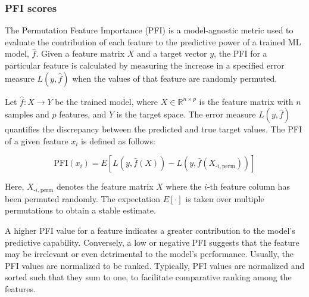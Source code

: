 \subsubsection{PFI scores}

The Permutation Feature Importance (PFI) is a model-agnostic metric used to evaluate the contribution of each feature to the predictive power of a trained \gls{ML} model, \(\hat{f}\). Given a feature matrix \(X\) and a target vector \(y\), the \gls{PFI} for a particular feature is calculated by measuring the increase in a specified error measure \(L(y, \hat{f})\) when the values of that feature are randomly permuted.

Let \(\hat{f}: X \rightarrow Y\) be the trained model, where \(X \in \mathbb{R}^{n \times p}\) is the feature matrix with \(n\) samples and \(p\) features, and \(Y\) is the target space. The error measure \(L(y, \hat{f})\) quantifies the discrepancy between the predicted and true target values. The \gls{PFI} of a given feature \(x_i\) is defined as follows:

\begin{equation}
\text{PFI}(x_i) = E\left[ L(y, \hat{f}(X)) - L\left(y, \hat{f}(X_{\text{-}i, \text{perm}})\right) \right]
\end{equation}

Here, \(X_{\text{-}i, \text{perm}}\) denotes the feature matrix \(X\) where the \(i\)-th feature column has been permuted randomly. The expectation \(E[\cdot]\) is taken over multiple permutations to obtain a stable estimate.

A higher \gls{PFI} value for a feature indicates a greater contribution to the model's predictive capability. Conversely, a low or negative \gls{PFI} suggests that the feature may be irrelevant or even detrimental to the model's performance. Usually, the \gls{PFI} values are normalized to be ranked. Typically, \gls{PFI} values are normalized and sorted such that they sum to one, to facilitate comparative ranking among the features. 

